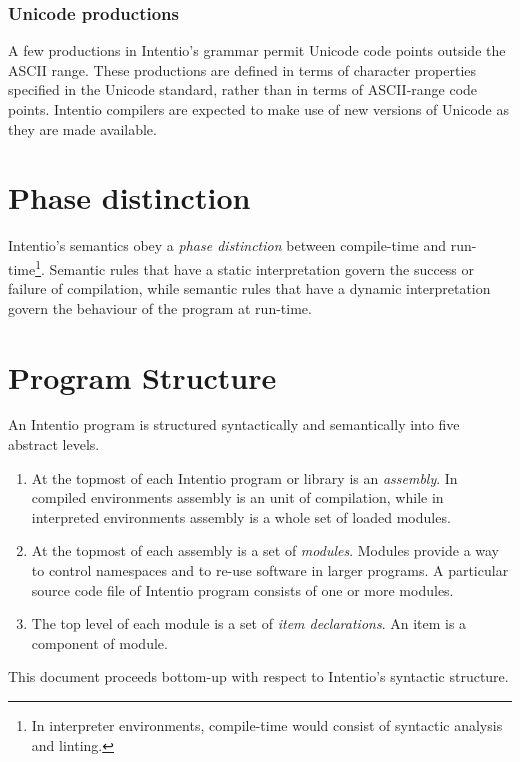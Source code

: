 \subsubsection{Unicode productions}

A few productions in Intentio's grammar permit Unicode\cite{Unicode6} code points outside the ASCII range. These productions are defined in terms of character properties specified in the Unicode standard, rather than in terms of ASCII-range code points. Intentio compilers are expected to make use of new versions of Unicode as they are made available.


\section{Phase distinction}

Intentio's semantics obey a \emph{phase distinction} between compile-time and run-time\footnote{In interpreter environments, compile-time would consist of syntactic analysis and linting.}. Semantic rules that have a static interpretation govern the success or failure of compilation, while semantic rules that have a dynamic interpretation govern the behaviour of the program at run-time.

\section{Program Structure}

An Intentio program is structured syntactically and semantically into five abstract levels.

\begin{enumerate}
  \item At the topmost of each Intentio program or library is an \emph{assembly}. In compiled environments assembly is an unit of compilation, while in interpreted environments assembly is a whole set of loaded modules.
  \item At the topmost of each assembly is a set of \emph{modules}. Modules provide a way to control namespaces and to re-use software in larger programs. A particular source code file of Intentio program consists of one or more modules.
  \item The top level of each module is a set of \emph{item declarations}. An item is a component of module.
\end{enumerate}

This document proceeds bottom-up with respect to Intentio's syntactic structure.

